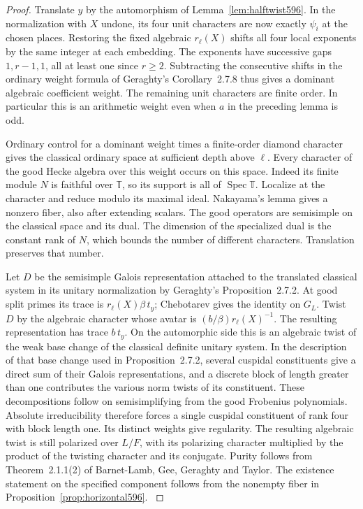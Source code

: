 \documentclass[a4paper,11pt]{article}
\theoremstyle{definition}
\theoremstyle{remark}
\numberwithin{equation}{section}
\begin{document}
\begin{proof}
Translate \(y\) by the automorphism of
Lemma~\ref{lem:halftwist596}. In the normalization with
\(X\) undone, its four unit characters are now exactly
\(\psi_i\) at the chosen places. Restoring the fixed
algebraic \(r_\ell(X)\) shifts all four local exponents by
the same integer at each embedding. The exponents have
successive gaps \(1,r-1,1\), all at least one since \(r\ge2\).
Subtracting the consecutive shifts in the ordinary weight
formula of Geraghty's Corollary~2.7.8 thus gives a dominant
algebraic coefficient weight. The remaining unit characters
are finite order. In particular this is an arithmetic
weight even when \(a\) in the preceding lemma is odd.

Ordinary control for a dominant weight times a finite-order
diamond character gives the classical ordinary space at
sufficient depth above \(\ell\). Every character of the
good Hecke algebra over this weight occurs on this space.
Indeed its finite module \(N\) is faithful over \(\mathbb T\),
so its support is all of \(\operatorname{Spec}\mathbb T\).
Localize at the character and reduce modulo its maximal
ideal. Nakayama's lemma gives a nonzero fiber, also after
extending scalars. The good operators are semisimple on
the classical space and its dual. The dimension of the
specialized dual is the constant rank of \(N\), which
bounds the number of different characters. Translation
preserves that number. \cite{XII-IX-geraghty363}

Let \(D\) be the semisimple Galois representation attached
to the translated classical system in its unitary
normalization by Geraghty's Proposition~2.7.2. At good
split primes its trace is \(r_\ell(X)\beta\,t_y\);
Chebotarev gives the identity on \(G_L\).
Twist \(D\) by the algebraic character whose avatar is
\((b/\beta)r_\ell(X)^{-1}\). The resulting representation
has trace \(b\,t_y\). On the automorphic side this is an
algebraic twist of the weak base change of the classical
definite unitary system. In the description of that base
change used in Proposition~2.7.2, several cuspidal
constituents give a direct sum of their Galois
representations, and a discrete block of length greater
than one contributes the various norm twists of its
constituent. These decompositions follow on semisimplifying
from the good Frobenius polynomials. Absolute irreducibility
therefore forces a single cuspidal constituent of rank four
with block length one. Its distinct weights give regularity.
The resulting algebraic twist is still polarized over
\(L/F\), with its polarizing character multiplied by the
product of the twisting character and its conjugate.
Purity follows from Theorem~2.1.1(2) of Barnet-Lamb, Gee,
Geraghty and Taylor. The existence statement on the
specified component follows from the nonempty fiber in
Proposition~\ref{prop:horizontal596}. \cite{XII-IX-geraghty363,XII-IX-blggt560}
\end{proof}
\end{document}
